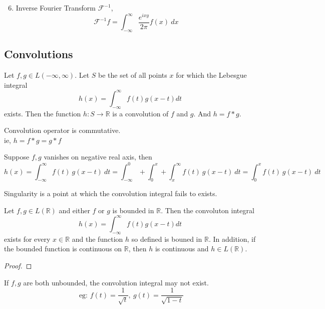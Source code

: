 \begin{enumerate}
	\setcounter{enumi}{5}
	\item Inverse Fourier Transform $\mathscr{F}^{-1}$,
		\[ \mathscr{F}^{-1}f = \int_{-\infty}^\infty \frac{e^{ixy}}{2\pi}f(x)\ dx \]
\end{enumerate}

\subsection{Convolutions}
\begin{definition}
	Let \( f,g \in L(-\infty,\infty) \).
	Let $S$ be the set of all points $x$ for which the Lebesgue integral
	\[ h(x) = \int_{-\infty}^\infty f(t) g(x-t) dt \]
	exists.
	Then the function \( h : S \to \mathbb{R} \) is a convolution of $f$ and $g$.
	And \( h = f \ast g \).
\end{definition}

\begin{remark}
	Convolution operator is commutative.\\
	ie, \( h = f \ast g = g \ast f \)
\end{remark}

\begin{remark}
	Suppose $f,g$ vanishes on negative real axis, then
	\[ h(x) = \int_{-\infty}^\infty f(t)\ g(x-t)\ dt = \int_{-\infty}^0 + \int_0^x  + \int_x^\infty f(t)\ g(x-t)\ dt = \int_0^x f(t)\ g(x-t)\ dt \] 
\end{remark}

\begin{remark}
	Singularity is a point at which the convolution integral fails to exists.
\end{remark}

\begin{theorem}
	Let \( f,g \in L(\mathbb{R}) \) and either $f$ or $g$ is bounded in $\mathbb{R}$.
	Then the convoluton integral
	\[ h(x) = \int_{-\infty}^\infty f(t) g(x-t) dt \]
	exists for every \( x \in \mathbb{R} \) and the function $h$ so defined is bouned in $\mathbb{R}$.
	In addition, if the bounded function is continuous on $\mathbb{R}$, then $h$ is continuous and \( h \in L(\mathbb{R}) \).
\end{theorem}
\begin{synopsis}
\end{synopsis}
\begin{proof}
\end{proof}

\begin{remark}
	If $f,g$ are both unbounded, the convolution integral may not exist.
	\[ \text{ eg: } f(t) = \frac{1}{\sqrt{t}},\ g(t) = \frac{1}{\sqrt{1-t}} \]
\end{remark}

